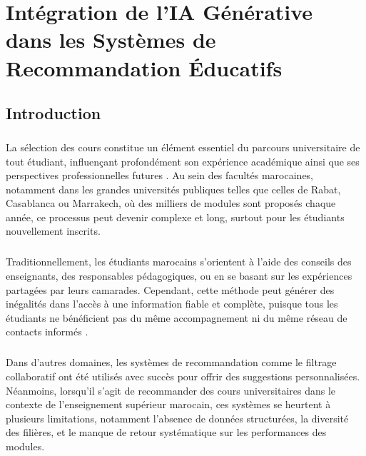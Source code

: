 \chapter{Intégration de l'IA Générative dans les Systèmes de Recommandation Éducatifs}

\section*{Introduction}
{}

\paragraph{}
La sélection des cours constitue un élément essentiel du parcours universitaire de tout étudiant, influençant profondément son expérience académique ainsi que ses perspectives professionnelles futures \cite{BruchFeinberg2017}. Au sein des facultés marocaines, notamment dans les grandes universités publiques telles que celles de Rabat, Casablanca ou Marrakech, où des milliers de modules sont proposés chaque année, ce processus peut devenir complexe et long, surtout pour les étudiants nouvellement inscrits.

\paragraph{}
Traditionnellement, les étudiants marocains s’orientent à l’aide des conseils des enseignants, des responsables pédagogiques, ou en se basant sur les expériences partagées par leurs camarades. Cependant, cette méthode peut générer des inégalités dans l’accès à une information fiable et complète, puisque tous les étudiants ne bénéficient pas du même accompagnement ni du même réseau de contacts informés \cite{LynchORiordan1998}.

\paragraph{}
Dans d’autres domaines, les systèmes de recommandation comme le filtrage collaboratif ont été utilisés avec succès pour offrir des suggestions personnalisées. Néanmoins, lorsqu’il s’agit de recommander des cours universitaires dans le contexte de l’enseignement supérieur marocain, ces systèmes se heurtent à plusieurs limitations, notamment l’absence de données structurées, la diversité des filières, et le manque de retour systématique sur les performances des modules.

